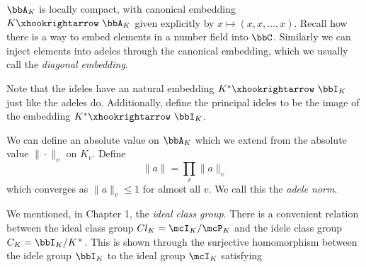 \documentclass[a4paper, 12pt,oneside,openany]{book}
\begin{document}
$\bbA_K$ is locally compact, with canonical embedding $K \xhookrightarrow\ \bbA_K$ given explicitly by $x \mapsto (x, x, \dots, x).$ Recall how there is a way to embed elements in a number field into $\bbC$. Similarly we can inject elements into adeles through the canonical embedding, which we usually call the \emph{diagonal embedding}.





Note that the ideles have an natural embedding $K^* \xhookrightarrow\ \bbI_K$ just like the adeles do. Additionally, define the principal ideles to be the image of the embedding $K^* \xhookrightarrow\ \bbI_K$.


We can define an absolute value on $\bbA_K$ which we extend from the absolute value $\|\cdot\|_v$ on $K_v$. Define $$\|a\| = \prod\limits_{v} \|a\|_v$$ which converges as $\|a\|_v \leq 1$ for almost all $v$. We call this the \emph{adele norm}.

We mentioned, in Chapter 1, the \emph{ideal class group}. There is a convenient relation between the ideal class group $Cl_K = \mcI_K / \mcP_K$ and the idele class group $C_K = \bbI_K / K^\times$. This is shown through the surjective homomorphism between the idele group $\bbI_K$ to the ideal group $\mcI_K$ satisfying
\end{document}

